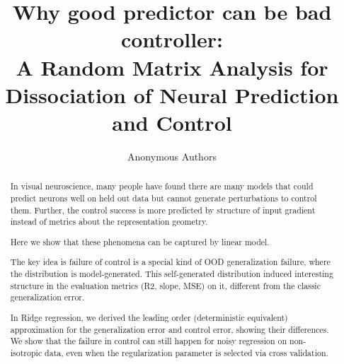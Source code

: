 \documentclass{article}
\title{Why good predictor can be bad controller: \\A Random Matrix Analysis for Dissociation of Neural Prediction and Control}
\author{Anonymous Authors}
\theoremstyle{plain}
\theoremstyle{definition}
\begin{document}
\maketitle

\begin{abstract}
In visual neuroscience, many people have found there are many models
that could predict neurons well on held out data but cannot generate
perturbations to control them. Further, the control success is more
predicted by structure of input gradient instead of metrics about
the representation geometry.

Here we show that these phenomena can be captured by linear model.

The key idea is failure of control is a special kind of OOD generalization
failure, where the distribution is model-generated. This self-generated
distribution induced interesting structure in the evaluation metrics
(R2, slope, MSE) on it, different from the classic generalization
error.

In Ridge regression, we derived the leading order (deterministic equivalent)
approximation for the generalization error and control error, showing
their differences. We show that the failure in control can still happen
for noisy regression on non-isotropic data, even when the regularization
parameter is selected via cross validation.


\end{abstract}
\end{document}
